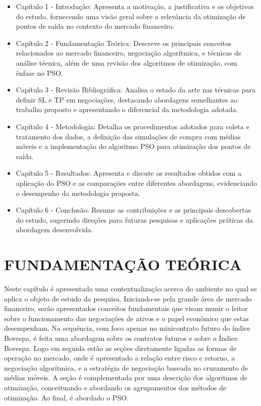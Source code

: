 \documentclass{iftex2024}
\begin{document}
\begin{itemize}
  \item Capítulo 1 - Introdução: Apresenta a motivação, a justificativa e os objetivos 
  do estudo, fornecendo uma visão geral sobre a relevância da otimização de pontos de saída no 
  contexto do mercado financeiro.
  \item Capítulo 2 - Fundamentação Teórica: Descreve os principais conceitos relacionados ao 
  mercado financeiro, negociação algorítmica, e técnicas de análise técnica, além de uma revisão dos 
  algoritmos de otimização, com ênfase no PSO. 
  \item Capítulo 3 - Revisão Bibliográfica: Analisa o estado da arte nas técnicas para definir SL e 
  TP em negociações, destacando abordagens semelhantes ao trabalho proposto e apresentando o diferencial da metodologia adotada.
  \item Capítulo 4 - Metodologia: Detalha os procedimentos adotados para coleta e tratamento dos dados, a definição 
  das simulações de compra com médias móveis e a implementação do algoritmo PSO para otimização dos pontos de saída.
  \item Capítulo 5 - Resultados: Apresenta e discute os resultados obtidos com a aplicação do PSO e as comparações entre 
  diferentes abordagens, evidenciando o desempenho da metodologia proposta.
  \item Capítulo 6 - Conclusão: Resume as contribuições e as principais descobertas do estudo, sugerindo direções para 
  futuras pesquisas e aplicações práticas da abordagem desenvolvida.
\end{itemize}

\chapter{FUNDAMENTAÇÃO TEÓRICA}

Neste capítulo é apresentada uma contextualização acerca do ambiente no
qual se aplica o objeto de estudo da pesquisa. Iniciando-se pela grande área de mercado
financeiro, serão apresentados conceitos fundamentais que visam munir o leitor sobre o
funcionamento das negociações de ativos e o papel econômico que estas desempenham.
Na sequência, com foco apenas no minicontrato futuro do índice Bovespa, é feita uma
abordagem sobre os contratos futuros e sobre o Índice Bovespa. Logo em seguida estão
as seções diretamente ligadas as formas de operação no mercado, onde é apresentado
a relação entre risco e retorno, a negociação algorítmica, e a estratégia de negociação
baseada no cruzamento de médias móveis. A seção é complementada por uma descrição
dos algoritmos de otimização, conceituando e abordando os agrupamentos dos métodos
de otimização. Ao final, é abordado o PSO.
\end{document}
